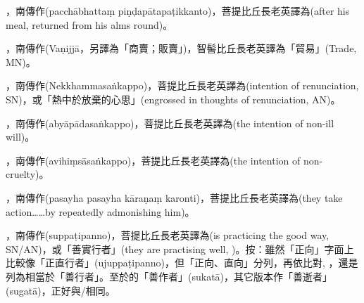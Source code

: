 \startitemgroup[noteitems]
\item{}，南傳作(pacchābhattaṃ piṇḍapātapaṭikkanto)，菩提比丘長老英譯為(after his meal, returned from his alms round)。
\stopitemgroup

\startitemgroup[noteitems]
\item{}，南傳作(Vaṇijjā，另譯為「商賣；販賣」)，智髻比丘長老英譯為「貿易」(Trade, MN)。
\stopitemgroup

\startitemgroup[noteitems]
\item{}，南傳作(Nekkhammasaṅkappo)，菩提比丘長老英譯為(intention of renunciation, SN)，或「熱中於放棄的心思」(engrossed in thoughts of renunciation, AN)。
\stopitemgroup

\startitemgroup[noteitems]
\item{}，南傳作(abyāpādasaṅkappo)，菩提比丘長老英譯為(the intention of non-ill will)。
\stopitemgroup

\startitemgroup[noteitems]
\item{}，南傳作(avihiṃsāsaṅkappo)，菩提比丘長老英譯為(the intention of non-cruelty)。
\stopitemgroup

\startitemgroup[noteitems]
\item{}，南傳作(pasayha pasayha kāraṇaṃ karonti)，菩提比丘長老英譯為(they take action……by repeatedly admonishing him)。
\stopitemgroup

\startitemgroup[noteitems]
\item{}，南傳作(suppaṭipanno)，菩提比丘長老英譯為(is practicing the good way, SN/AN)，或「善實行者」(they are practising well, )。按：雖然「正向」字面上比較像「正直行者」(ujuppaṭipanno)，但「正向、直向」分列，再依比對, ，還是列為相當於「善行者」。至於的「善作者」(sukatā)，其它版本作「善逝者」(sugatā)，正好與/相同。
\stopitemgroup

